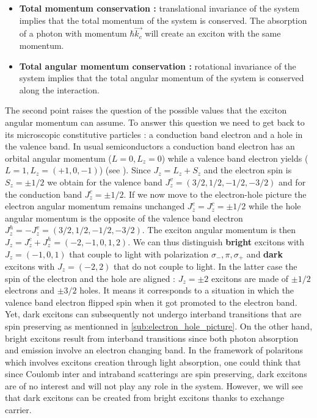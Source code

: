 \begin{itemize}
    \item \textbf{Total momentum conservation :}  translational invariance of the system implies that the total momentum of the system is conserved. The absorption of a photon with momentum 
    $\hbar \vec{k_c}$ will create an exciton with the same momentum.
    \item  \textbf{Total angular momentum conservation :} rotational invariance of the system implies that the total angular momentum of the system is conserved along the interaction.
\end{itemize}

The second point raises the question of the possible values that the exciton angular momentum can assume. To answer this question we need to get back to its 
microscopic constitutive particles : a conduction band electron and a hole in the valence band. In usual semiconductors a conduction band electron has an orbital angular momentum ($L=0 , L_z=0$) while a valence band electron yields ($L=1 , L_z=(+1,0,-1)$) (see \cite{kittel_introduction_2005}).
Since $J_z = L_z + S_z$ and the electron spin is $S_z = \pm 1/2$ we obtain for the valence band $J_z^{v} = (3/2, 1/2, -1/2, -3/2)$ and for the conduction band $J_z^{c} = \pm 1/2$. If we now move to the electron-hole picture the electron angular momentum remains unchanged $J_z^{e}=J_z^{c}= \pm 1/2$ while the hole angular momentum is the opposite of the valence band electron $J_z^{h} = -J_z^{v}=(3/2, 1/2, -1/2, -3/2)$.
 The exciton angular momentum is then $J_z = J_z^{e} + J_z^{h} = (-2,-1,0,1,2)$. We can thus distinguish \textbf{bright} excitons with $J_z = (-1,0,1)$ that couple to light with polarization $\sigma_-,\pi,\sigma_+ $ and \textbf{dark} excitons with $J_z = (-2,2)$ that do not couple to light. 
In the latter case the spin of the electron and the hole are aligned : $J_z= \pm 2$ excitons are made of $\pm1/2$ electrons and $\pm3/2$ holes. It means it corresponds to a situation in which the valence band electron flipped spin when it got promoted to the electron band. Yet, dark excitons can subsequently not undergo interband transitions that are spin preserving as mentionned in \autoref{sub:electron_hole_picture}. 
On the other hand, bright excitons result from interband transitions since both photon absorption and emission involve an electron changing band. In the framework of polaritons which involves excitons creation through light absorption, one could think that since
Coulomb inter and intraband scatterings are spin preserving, dark excitons are of no interest and will not play any role in the system. However, we will see that dark excitons can be created from bright excitons thanks to exchange carrier.




